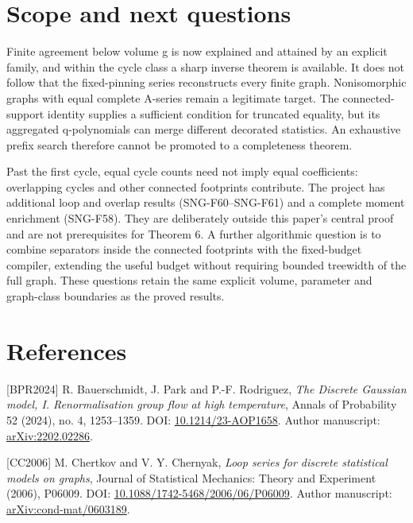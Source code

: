 \documentclass[
  11pt,
  a4paper,
]{article}
\begin{document}
\hypertarget{scope-and-next-questions}{%
\section{Scope and next questions}\label{scope-and-next-questions}}

Finite agreement below volume g is now explained and attained by an
explicit family, and within the cycle class a sharp inverse theorem is
available. It does not follow that the fixed-pinning series reconstructs
every finite graph. Nonisomorphic graphs with equal complete A-series
remain a legitimate target. The connected-support identity supplies a
sufficient condition for truncated equality, but its aggregated
q-polynomials can merge different decorated statistics. An exhaustive
prefix search therefore cannot be promoted to a completeness theorem.

Past the first cycle, equal cycle counts need not imply equal
coefficients: overlapping cycles and other connected footprints
contribute. The project has additional loop and overlap results
(SNG-F60--SNG-F61) and a complete moment enrichment (SNG-F58). They are
deliberately outside this paper's central proof and are not
prerequisites for Theorem 6. A further algorithmic question is to
combine separators inside the connected footprints with the fixed-budget
compiler, extending the useful budget without requiring bounded
treewidth of the full graph. These questions retain the same explicit
volume, parameter and graph-class boundaries as the proved results.

\hypertarget{references}{%
\section*{References}\label{references}}

{[}BPR2024{]} R. Bauerschmidt, J. Park and P.-F. Rodriguez, \emph{The
Discrete Gaussian model, I. Renormalisation group flow at high
temperature}, Annals of Probability 52 (2024), no. 4, 1253--1359. DOI:
\href{https://doi.org/10.1214/23-AOP1658}{10.1214/23-AOP1658}. Author
manuscript: \href{https://arxiv.org/abs/2202.02286}{arXiv:2202.02286}.

{[}CC2006{]} M. Chertkov and V. Y. Chernyak, \emph{Loop series for
discrete statistical models on graphs}, Journal of Statistical
Mechanics: Theory and Experiment (2006), P06009. DOI:
\href{https://doi.org/10.1088/1742-5468/2006/06/P06009}{10.1088/1742-5468/2006/06/P06009}.
Author manuscript:
\href{https://arxiv.org/abs/cond-mat/0603189}{arXiv:cond-mat/0603189}.
\end{document}
